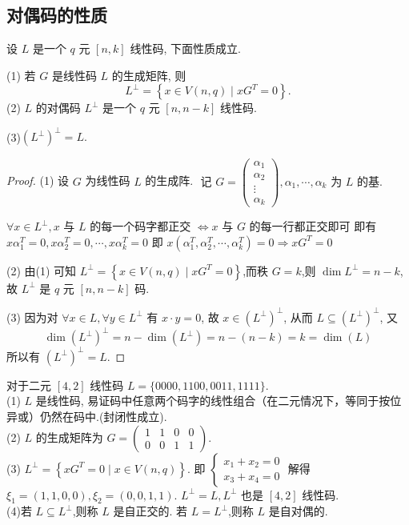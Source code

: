 \subsection{对偶码的性质}
\begin{theorem}
 设 $ L $ 是一个 $ q $ 元 $ [n, k] $ 线性码, 下面性质成立.
 
(1) 若 $ G $ 是线性码 $ L $ 的生成矩阵, 则
$$
L^{\perp}=\left\{x \in V(n, q) \mid x G^{T}=0\right\} .
$$
(2) $ L $ 的对偶码 $ L^{\perp} $ 是一个 $ q $ 元 $ [n, n-k] $ 线性码.

(3)$\left(L^{\perp}\right)^{\perp}=L \text {. }$
\end{theorem}
\begin{proof}
(1) 设 $ G $ 为线性码 $ L $ 的生成阵. $
\text { 记 } G=\left(\begin{array}{c}
\alpha_{1} \\
\alpha_{2} \\
\vdots \\
\alpha_{k}
\end{array}\right), \alpha_{1}, \cdots, \alpha_{k} \text { 为 } L \text { 的基. }$

$ \forall x \in L^{\perp}, x $ 与 $ L $ 的每一个码字都正交 $ \Leftrightarrow x $ 与 $ G $ 的每一行都正交即可
即有 $ x \alpha_{1}^{T}=0, x \alpha_{2}^{T}=0, \cdots, x \alpha_{k}^{T}=0 $
即 $ x\left(\alpha_{1}^{T}, \alpha_{2}^{T}, \cdots, \alpha_{k}^{T}\right)=0 \Rightarrow x G^{T}=0 $

(2) 由(1) 可知 $ L^{\perp}=\left\{x \in V(n, q) \mid x G^{T}=0\right\} $,而秩 $ G=k $,则 $ \operatorname{dim} L^{\perp}=n-k $,故 $ L^{\perp} $ 是 $ q $ 元 $ [n, n-k] $ 码.

(3) 因为对 $ \forall x \in L, \forall y \in L^{\perp} $ 有 $ x \cdot y=0 $, 故 $ x \in\left(L^{\perp}\right)^{\perp} $, 从而 $ L \subseteq\left(L^{\perp}\right)^{\perp} $, 又
$$
\operatorname{dim}\left(L^{\perp}\right)^{\perp}=n-\operatorname{dim}\left(L^{\perp}\right)=n-(n-k)=k=\operatorname{dim}(L)
$$
所以有 $ \left(L^{\perp}\right)^{\perp}=L $.
\end{proof}

\begin{example}
 对于二元 $ [4,2] $ 线性码 $ L=\{0000,1100,0011,1111\} $.\\
(1) $ L $ 是线性码, 易证码中任意两个码字的线性组合（在二元情况下，等同于按位异或）仍然在码中.(封闭性成立).\\
(2) $ L $ 的生成矩阵为 $ G=\left(\begin{array}{llll}1 & 1 & 0 & 0 \\ 0 & 0 & 1 & 1\end{array}\right) $.\\
(3) $ L^{\perp}=\left\{x G^{T}=0 \mid x \in V(n, q)\right\} $.
即 $ \left\{\begin{array}{l}x_{1}+x_{2}=0 \\ x_{3}+x_{4}=0\end{array}\right. $
解得 $ \xi_{1}=(1,1,0,0), \xi_{2}=(0,0,1,1) $.
$ L^{\perp}=L, L^{\perp} $ 也是 $ [4,2] $ 线性码.\\
(4)若 $ L \subseteq L^{\perp} $,则称 $ L $ 是自正交的.
若 $ L=L^{\perp} $,则称 $ L $ 是自对偶的.
\end{example}

